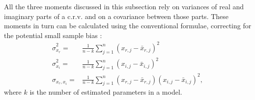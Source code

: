 \documentclass[
]{book}
\begin{document}
All the three moments discussed in this subsection rely on variances of real and imaginary parts of a c.r.v. and on a covariance between those parts. These moments in turn can be calculated using the conventional formulae, correcting for the potential small sample bias \citep{referenceSBA}:
\begin{equation}
    \begin{aligned}
        \hat{\sigma}_{x_r}^2 = & \frac{1}{n-k} \sum_{j=1}^n (x_{r,j}-\bar{x}_{r,j})^2 \\
        \hat{\sigma}_{x_i}^2 = & \frac{1}{n-k} \sum_{j=1}^n (x_{i,j}-\bar{x}_{i,j})^2 \\
        \hat{\sigma}_{x_r, x_i} = & \frac{1}{n-k} \sum_{j=1}^n (x_{r,j}-\bar{x}_{r,j})(x_{i,j}-\bar{x}_{i,j})^2 ,
    \end{aligned}
    \label{eq:crvMomentSecondSample}
\end{equation}
where \(k\) is the number of estimated parameters in a model.
\end{document}
